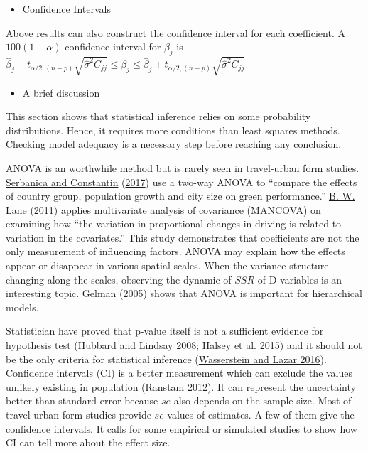 \documentclass[
  11pt,
  openany]{memoir}
\providecommand{\tightlist}{%
  \setlength{\itemsep}{0pt}\setlength{\parskip}{0pt}}
\begin{document}
\begin{itemize}
\tightlist
\item
  Confidence Intervals
\end{itemize}

Above results can also construct the confidence interval for each coefficient. A \(100(1-\alpha)\) confidence interval for \(\beta_j\) is \(\hat\beta_j-t_{\alpha/2,(n-p)}\sqrt{\hat\sigma^2C_{jj}}\le \beta_j \le \hat\beta_j+t_{\alpha/2,(n-p)}\sqrt{\hat\sigma^2C_{jj}}\).

\begin{itemize}
\tightlist
\item
  A brief discussion
\end{itemize}

This section shows that statistical inference relies on some probability distributions.
Hence, it requires more conditions than least squares methods.
Checking model adequacy is a necessary step before reaching any conclusion.

ANOVA is an worthwhile method but is rarely seen in travel-urban form studies.
\protect\hyperlink{ref-serbanicaSustainableCitiesCentral2017}{Serbanica and Constantin} (\protect\hyperlink{ref-serbanicaSustainableCitiesCentral2017}{2017}) use a two-way ANOVA to ``compare the effects of country group, population growth and city size on green performance.''
\protect\hyperlink{ref-laneTAZlevelVariationWork2011}{B. W. Lane} (\protect\hyperlink{ref-laneTAZlevelVariationWork2011}{2011}) applies multivariate analysis of covariance (MANCOVA) on examining how ``the variation in proportional changes in driving is related to variation in the covariates.''
This study demonstrates that coefficients are not the only measurement of influencing factors.
ANOVA may explain how the effects appear or disappear in various spatial scales.
When the variance structure changing along the scales, observing the dynamic of \(SSR\) of D-variables is an interesting topic.
\protect\hyperlink{ref-gelmanAnalysisVarianceWhy2005}{Gelman} (\protect\hyperlink{ref-gelmanAnalysisVarianceWhy2005}{2005}) shows that ANOVA is important for hierarchical models.

Statistician have proved that p-value itself is not a sufficient evidence for hypothesis test (\protect\hyperlink{ref-hubbardWhyValuesAre2008}{Hubbard and Lindsay 2008}; \protect\hyperlink{ref-halseyFickleValueGenerates2015}{Halsey et al. 2015}) and it should not be the only criteria for statistical inference (\protect\hyperlink{ref-wassersteinASAStatementPValues2016}{Wasserstein and Lazar 2016}).
Confidence intervals (CI) is a better measurement which can exclude the values unlikely existing in population (\protect\hyperlink{ref-ranstamWhyPvalueCulture2012}{Ranstam 2012}).
It can represent the uncertainty better than standard error because \(se\) also depends on the sample size.
Most of travel-urban form studies provide \(se\) values of estimates. A few of them give the confidence intervals.
It calls for some empirical or simulated studies to show how CI can tell more about the effect size.
\end{document}
